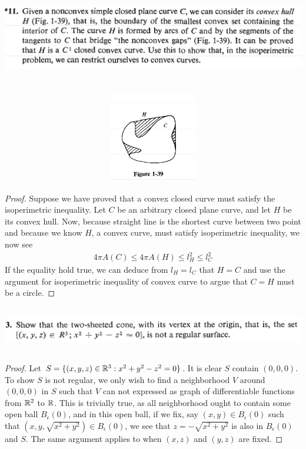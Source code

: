 \documentclass{report}
\begin{document}
\begin{question}{}{}
\includegraphics[height=4cm,width=18cm]{hw2q11}

\includegraphics[height=4cm,width=18cm]{hw2q10}
\end{question}
\begin{proof}
Suppose we have proved that a convex closed curve must satisfy the isoperimetric inequality. Let $C$ be an arbitrary closed plane curve, and let  $H$ be its convex hull. Now, because straight line is the shortest curve between two point and because we know $H$, a convex curve, must satisfy isoperimetric inequality, we now see 
 \begin{align*}
4 \pi A(C)\leq 4 \pi A(H)\leq l_H^2 \leq l_C^2
\end{align*}
If the equality hold true, we can deduce from $l_H=l_C$ that  $H=C$ and use the argument for isoperimetric inequality of convex curve to argue that $C=H$ must be a circle.
\end{proof}
\begin{question}{}{}
\includegraphics[height=2cm,width=18cm]{hw2q9}
\end{question}
\begin{proof}
Let $S=\{ (x,y,z)\in\mathbb{R}^3:x^2+y^2-z^2=0 \}$. It is clear $S$ contain  $(0,0,0)$. To show $S$ is not regular, we only wish to find a neighborhood $V$ around  $(0,0,0)$ in $S$ such that  $V$ can not expressed as graph of differentiable functions from $\mathbb{R}^2$ to  $\mathbb{R}$. This is trivially true, as all neighborhood ought to contain some open ball $B_\epsilon (0)$, and in this open ball, if we fix, say $(x,y)\in B_\epsilon (0)$ such that $(x,y,\sqrt{x^2+y^2}) \in B_\epsilon (0)$, we see that $z=-\sqrt{x^2+y^2} $ is also in $B_\epsilon (0)$ and $S$. The same argument applies to when $(x,z)$ and $(y,z)$ are fixed. 
\end{proof}
\end{document}
